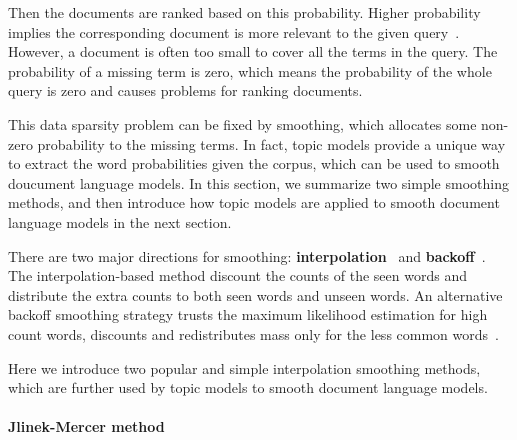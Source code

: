 Then the documents are ranked based on this probability. Higher probability implies the corresponding document is more relevant to the given query~\citep{song-99}. However, a document is often too small to cover all the terms in the query. The probability of a missing term is zero, which means the probability of the whole query is zero and causes problems for ranking documents. 

This data sparsity problem can be fixed by smoothing, which allocates some non-zero probability to the missing terms. In fact, topic models provide a unique way to extract the word probabilities given the corpus, which can be used to smooth doucument language models.
In this section, we summarize two simple smoothing methods, and then introduce how topic models are applied to smooth document language models in the next section.



There are two major directions for smoothing: \textbf{interpolation}~\citep{Jelinek-1980,mackay95dirichlet,Ney-1994,PonteCroft,zhai-01} and \textbf{backoff}~\citep{katz-87,song-99}. The interpolation-based method discount the counts of the seen words and distribute the extra counts to both seen words and unseen words. An alternative backoff smoothing strategy trusts the maximum likelihood estimation for high count words, discounts and  redistributes mass only for the less common words~\citep{zhai-01}.

Here we introduce two popular and simple interpolation smoothing methods, which are further used by topic models to smooth document language models.

\paragraph{Jlinek-Mercer method}

